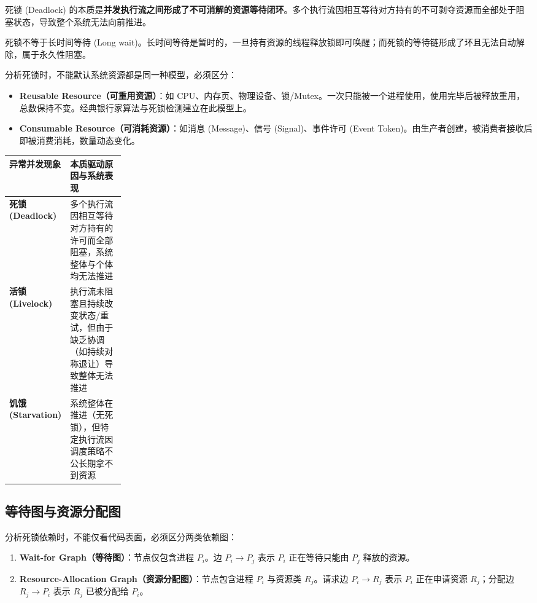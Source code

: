 \documentclass[11pt,a4paper]{ctexart}
\newcommand{\kw}[1]{\textbf{#1}}
\begin{document}
死锁 (Deadlock) 的本质是\kw{并发执行流之间形成了不可消解的资源等待闭环}。多个执行流因相互等待对方持有的不可剥夺资源而全部处于阻塞状态，导致整个系统无法向前推进。

死锁不等于长时间等待 (Long wait)。长时间等待是暂时的，一旦持有资源的线程释放锁即可唤醒；而死锁的等待链形成了环且无法自动解除，属于永久性阻塞。

\begin{method}
分析死锁时，不能默认系统资源都是同一种模型，必须区分：
\begin{itemize}
  \item \kw{Reusable Resource（可重用资源）}：如 CPU、内存页、物理设备、锁/Mutex。一次只能被一个进程使用，使用完毕后被释放重用，总数保持不变。经典银行家算法与死锁检测建立在此模型上。
  \item \kw{Consumable Resource（可消耗资源）}：如消息 (Message)、信号 (Signal)、事件许可 (Event Token)。由生产者创建，被消费者接收后即被消费消耗，数量动态变化。
\end{itemize}
\end{method}

\begingroup
\small
\renewcommand{\arraystretch}{1.25}
\setlength{\tabcolsep}{6pt}
\begin{tabularx}{\linewidth}{>{\bfseries}p{0.22\linewidth} X}
\toprule
异常并发现象 & 本质驱动原因与系统表现\\
\midrule
死锁 (Deadlock) & 多个执行流因相互等待对方持有的许可而全部阻塞，系统整体与个体均无法推进\\
活锁 (Livelock) & 执行流未阻塞且持续改变状态/重试，但由于缺乏协调（如持续对称退让）导致整体无法推进\\
饥饿 (Starvation) & 系统整体在推进（无死锁），但特定执行流因调度策略不公长期拿不到资源\\
\bottomrule
\end{tabularx}
\endgroup

\subsection{等待图与资源分配图}

分析死锁依赖时，不能仅看代码表面，必须区分两类依赖图：

\begin{enumerate}
\item \kw{Wait-for Graph（等待图）}：节点仅包含进程 $P_i$。边 $P_i \to P_j$ 表示 $P_i$ 正在等待只能由 $P_j$ 释放的资源。
\item \kw{Resource-Allocation Graph（资源分配图）}：节点包含进程 $P_i$ 与资源类 $R_j$。请求边 $P_i \to R_j$ 表示 $P_i$ 正在申请资源 $R_j$；分配边 $R_j \to P_i$ 表示 $R_j$ 已被分配给 $P_i$。
\end{enumerate}
\end{document}
